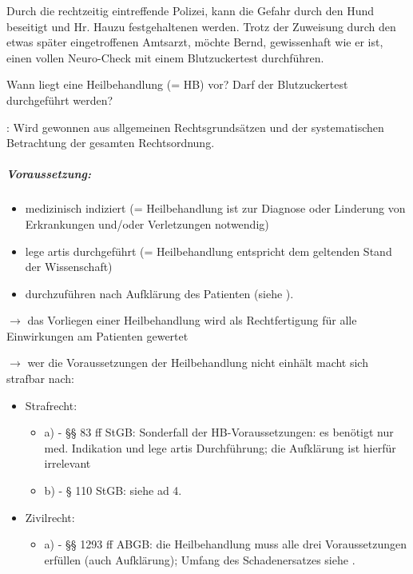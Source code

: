 Durch die rechtzeitig eintreffende Polizei, kann die Gefahr durch den
Hund beseitigt und Hr. Hauzu festgehaltenen werden. Trotz der Zuweisung
durch den etwas später eingetroffenen Amtsarzt, m\"ochte Bernd,
gewissenhaft wie er ist, einen vollen Neuro-Check mit einem
Blutzuckertest durchf\"uhren.

Wann liegt eine  Heilbehandlung  (= HB) vor? Darf der Blutzuckertest
durchgef\"uhrt werden?


:
Wird gewonnen aus allgemeinen Rechtsgrundsätzen und der systematischen
Betrachtung der gesamten Rechtsordnung.

\subparagraph{Voraussetzung:}

\begin{itemize}
    \item medizinisch indiziert (= Heilbehandlung ist zur Diagnose oder Linderung von Erkrankungen und/oder Verletzungen notwendig)
    \item lege artis durchgef\"uhrt (= Heilbehandlung entspricht dem geltenden Stand der Wissenschaft)
    \item durchzuf\"uhren nach Aufklärung des Patienten
    (siehe ).
\end{itemize}

${\rightarrow}$ das Vorliegen einer Heilbehandlung wird als Rechtfertigung f\"ur
alle Einwirkungen am Patienten gewertet

${\rightarrow}$ wer die Voraussetzungen der Heilbehandlung nicht einhält macht
sich strafbar nach:

\begin{itemize}
    \item Strafrecht:
    
    \begin{itemize}
        \item a)  - {\S}{\S} 83 ff StGB: Sonderfall der HB-Voraussetzungen: es ben\"otigt nur med. Indikation und lege artis Durchf\"uhrung; die Aufklärung ist hierf\"ur irrelevant
        
        \item b)  - {\S} 110 StGB: siehe ad 4.
        
    \end{itemize}
    \item Zivilrecht:
    \begin{itemize}
        \item a)  - {\S}{\S}
        1293 ff ABGB: die Heilbehandlung muss alle drei
        Voraussetzungen erf\"ullen (auch Aufklärung);
        Umfang des Schadenersatzes siehe .
    \end{itemize}
    
\end{itemize}

